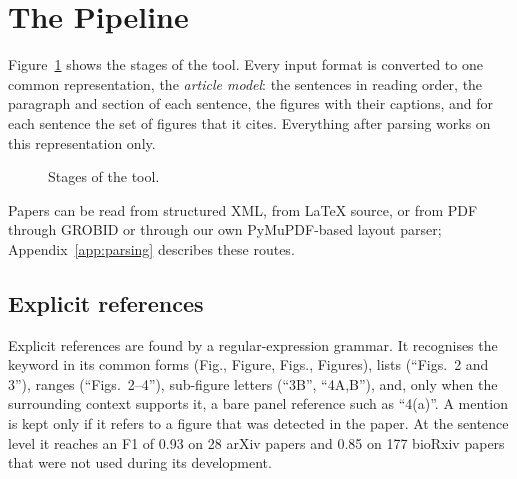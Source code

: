 \section{The Pipeline}
\label{sec:pipeline}

Figure~\ref{fig:pipeline} shows the stages of the tool. Every input format is converted to one common
representation, the \emph{article model}: the sentences in reading order, the paragraph and section of each
sentence, the figures with their captions, and for each sentence the set of figures that it cites. Everything
after parsing works on this representation only.

\begin{figure}[h]
\centering
{}
\caption{Stages of the tool.}
\label{fig:pipeline}
\end{figure}

Papers can be read from structured XML, from \LaTeX{} source, or from PDF through GROBID or through our own
PyMuPDF-based layout parser; Appendix~\ref{app:parsing} describes these routes.

\subsection{Explicit references}
Explicit references are found by a regular-expression grammar. It recognises the keyword in its common forms
(Fig., Figure, Figs., Figures), lists (``Figs.~2 and 3''), ranges (``Figs.~2--4''), sub-figure letters (``3B'',
``4A,B''), and, only when the surrounding context supports it, a bare panel reference such as ``4(a)''. A
mention is kept only if it refers to a figure that was detected in the paper. At the sentence level it reaches
an F1 of 0.93 on 28 arXiv papers and 0.85 on 177 bioRxiv papers that were not used during its development.

